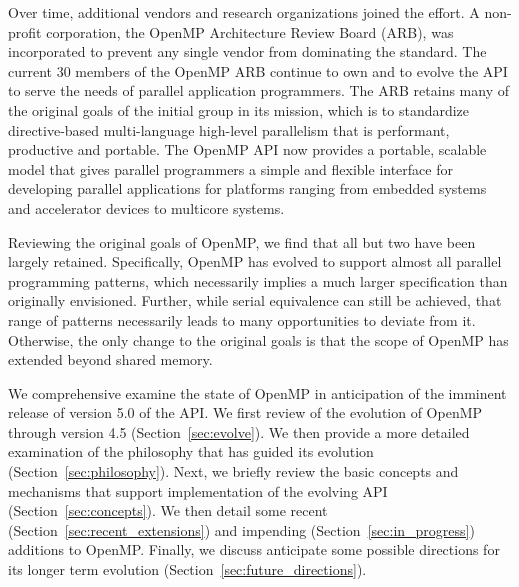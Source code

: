 Over time, additional vendors and research organizations joined the effort.  A
non-profit corporation, the OpenMP Architecture Review Board (ARB), was 
incorporated to prevent any single vendor from dominating the standard.
The current 30 members of the OpenMP ARB continue to own and to evolve 
the API to serve the needs of parallel application programmers. The ARB
retains many of the original goals of the initial group in its mission,
which is to standardize directive-based multi-language high-level 
parallelism that is performant, productive and portable. The OpenMP 
API now provides a portable, scalable model that gives parallel 
programmers a simple and flexible interface for developing parallel 
applications for platforms ranging from embedded systems and accelerator 
devices to multicore systems.

Reviewing the original goals of OpenMP, we find that all but two have 
been largely retained. Specifically, OpenMP has evolved to support almost 
all parallel programming patterns, which necessarily implies a much larger 
specification than originally envisioned. Further, while serial equivalence
can still be achieved, that range of patterns necessarily leads to many
opportunities to deviate from it. Otherwise, the only change to the original
goals is that the scope of OpenMP has extended beyond shared memory. 

We comprehensive examine the state of OpenMP in anticipation of the imminent 
release of version 5.0 of the API. We first review of the evolution of OpenMP 
through version 4.5 (Section~\ref{sec:evolve}). We then provide a more 
detailed examination of the philosophy that has guided its evolution 
(Section~\ref{sec:philosophy}). Next, we briefly review the basic concepts 
and mechanisms that support implementation of the evolving API 
(Section~\ref{sec:concepts}). We then detail some recent 
(Section~\ref{sec:recent_extensions}) and impending 
(Section~\ref{sec:in_progress}) additions to OpenMP. Finally, we discuss
anticipate some possible directions for its longer term evolution
(Section~\ref{sec:future_directions}).
